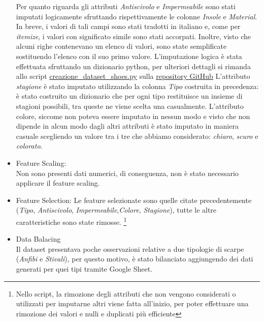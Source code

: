 \documentclass[a4paper, 11pt, oneside]{report}
\begin{document}
\begin{itemize}
\begin{center}
                    \end{center}
                    Per quanto riguarda gli attributi  \emph{Antiscivolo} e \emph{Impermeabile} sono stati imputati
                    logicamente sfruttando rispettivamente le colonne \emph{Insole} e \emph{Material}.
                    In breve, i valori di tali campi sono stati tradotti in italiano e, come per \emph{itemize}, i valori con significato simile sono stati
                    accorpati.
                    Inoltre, visto che alcuni righe contenevano un elenco di valori, sono state semplificate sostituendo l'elenco con il suo primo valore.
                    L'imputazione logica è stata effettuata sfruttando un dizionario python, per ulteriori dettagli si rimanda allo script
                    \href{https://github.com/frankzamma/NC22_WeatherStyle_classe03/blob/b8a2eb2de4f72fd37752e2c480e764e8797826f8/CreazioneDatasets/dataset_shoes/creazione_dataset_shoes.py}{creazione\_dataset\_shoes.py} sulla \href{https://github.com/frankzamma/NC22_WeatherStyle_classe03}{repository GitHub}
                    L'attributo \emph{stagione} è stato imputato utilizzando la colonna \emph{Tipo} costruita in precedenza: è stato costruito un dizionario
                    che per ogni tipo restituisce un insieme di stagioni possibili, tra queste ne viene scelta una casualmente.
                    L'attributo colore, siccome non poteva essere imputato in nessun modo e visto che non dipende in alcun modo dagli altri attributi
                    è stato imputato in maniera casuale scegliendo un valore tra i tre che abbiamo considerato: \emph{chiaro}, \emph{scuro} e \emph{colorato}.
                    \item Feature Scaling:\\
                    Non sono presenti dati numerici, di conseguenza, non è stato necessario applicare il feature scaling.
                    \item Feature Selection:
                    Le feature selezionate sono quelle citate precedentemente (\emph{Tipo}, \emph{Antiscivolo}, \emph{Impermeabile},\emph{Colore}, \emph{Stagione}), tutte le altre caratteristiche sono state rimosse.
                    \footnote{Nello script, la rimozione degli attributi che non vengono considerati o utilizzati per imputarne altri viene fatta all'inizio, per poter effettuare una rimozione dei valori e nulli e duplicati più efficiente}
                    \item Data Balacing\\
                    Il dataset presentava poche osservazioni relative a due tipologie di scarpe (\emph{Anfibi} e \emph{Stivali}), per questo motivo, è stato bilanciato aggiungendo dei dati generati per quei tipi tramite Google Sheet.
                \end{itemize}
\end{document}
